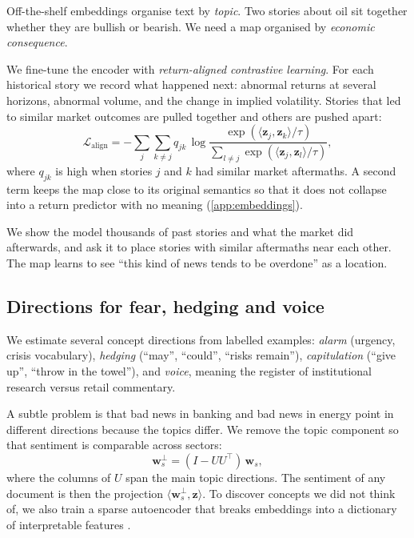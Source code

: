 \documentclass[11pt,a4paper]{article}
\theoremstyle{plain}
\theoremstyle{definition}
\newcommand{\z}{\bm{z}}
\newcommand{\w}{\bm{w}}
\begin{document}
Off-the-shelf embeddings organise text by \emph{topic}. Two stories about oil sit together whether they are bullish or bearish. We need a map organised by \emph{economic consequence}.

We fine-tune the encoder with \emph{return-aligned contrastive learning}. For each historical story we record what happened next: abnormal returns at several horizons, abnormal volume, and the change in implied volatility. Stories that led to similar market outcomes are pulled together and others are pushed apart:
\begin{equation}
  \mathcal{L}_{\text{align}} = -\sum_{j}\sum_{k\neq j} q_{jk}\,\log\frac{\exp(\langle\z_j,\z_k\rangle/\tau)}{\sum_{l\neq j}\exp(\langle\z_j,\z_l\rangle/\tau)},
\end{equation}
where $q_{jk}$ is high when stories $j$ and $k$ had similar market aftermaths. A second term keeps the map close to its original semantics so that it does not collapse into a return predictor with no meaning (\cref{app:embeddings}).

\begin{plainwords}
We show the model thousands of past stories and what the market did afterwards, and ask it to place stories with similar aftermaths near each other. The map learns to see ``this kind of news tends to be overdone'' as a location.
\end{plainwords}

\subsection{Directions for fear, hedging and voice}

We estimate several concept directions from labelled examples: \emph{alarm} (urgency, crisis vocabulary), \emph{hedging} (``may'', ``could'', ``risks remain''), \emph{capitulation} (``give up'', ``throw in the towel''), and \emph{voice}, meaning the register of institutional research versus retail commentary.

A subtle problem is that bad news in banking and bad news in energy point in different directions because the topics differ. We remove the topic component so that sentiment is comparable across sectors:
\begin{equation}
  \w_s^\perp = (I - UU^\top)\,\w_s,
\end{equation}
where the columns of $U$ span the main topic directions. The sentiment of any document is then the projection $\langle \w_s^\perp, \z\rangle$. To discover concepts we did not think of, we also train a sparse autoencoder that breaks embeddings into a dictionary of interpretable features \citep{cunningham2023,bricken2023}.
\end{document}

